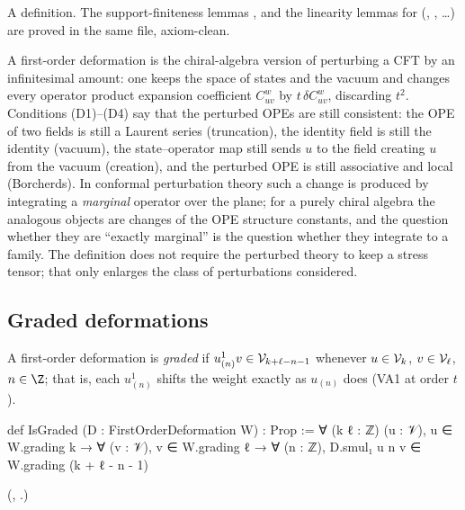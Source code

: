 \begin{status}
A definition. The support-finiteness lemmas \allowbreak{}\allowbreak{},
\allowbreak{}\allowbreak{} and the linearity lemmas for 
(, , \ldots) are proved in the same file, axiom-clean.
\end{status}

\begin{physics}
A first-order deformation is the chiral-algebra version of perturbing a CFT by an infinitesimal
amount: one keeps the space of states and the vacuum and changes every operator product expansion
coefficient $C_{uv}^{w}$ by $t\,\delta C_{uv}^{w}$, discarding $t^2$. Conditions (D1)--(D4) say that the perturbed
OPEs are still consistent: the OPE of two fields is still a Laurent series (truncation), the identity
field is still the identity (vacuum), the state--operator map still sends $u$ to the field creating $u$
from the vacuum (creation), and the perturbed OPE is still associative and local (Borcherds). In
conformal perturbation theory such a change is produced by integrating a \emph{marginal} operator over the
plane; for a purely chiral algebra the analogous objects are changes of the OPE structure constants, and
the question whether they are ``exactly marginal'' is the question whether they integrate to a family.
The definition does not require the perturbed theory to keep a stress tensor; that only enlarges the class
of perturbations considered.
\end{physics}

\subsection{Graded deformations}

\begin{definition}\label{l07:def:graded}
A first-order deformation is \emph{graded} if $u^1_{(n)}v\in\mathcal{V}_{k+\ell-n-1}$ whenever
$u\in\mathcal{V}_k$, $v\in\mathcal{V}_\ell$, $n\in\Z$; that is, each $u^1_{(n)}$ shifts the weight exactly as
$u_{(n)}$ does (VA1 at order $t$).
\end{definition}
\begin{leancode}
def IsGraded (D : FirstOrderDeformation W) : Prop :=
  ∀ (k ℓ : ℤ) (u : 𝒱), u ∈ W.grading k → ∀ (v : 𝒱), v ∈ W.grading ℓ → ∀ (n : ℤ),
    D.smul₁ u n v ∈ W.grading (k + ℓ - n - 1)
\end{leancode}
(, .)

